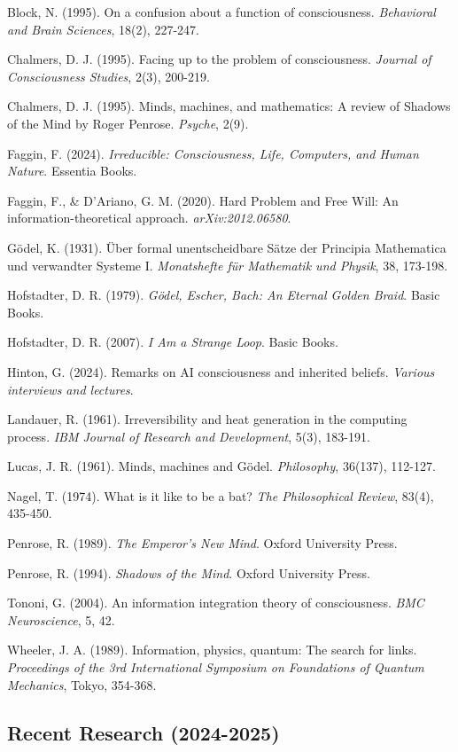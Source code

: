 \documentclass[12pt,a4paper]{article}
\begin{document}
Block, N. (1995). On a confusion about a function of consciousness. \textit{Behavioral and Brain Sciences}, 18(2), 227-247.

Chalmers, D. J. (1995). Facing up to the problem of consciousness. \textit{Journal of Consciousness Studies}, 2(3), 200-219.

Chalmers, D. J. (1995). Minds, machines, and mathematics: A review of Shadows of the Mind by Roger Penrose. \textit{Psyche}, 2(9).

Faggin, F. (2024). \textit{Irreducible: Consciousness, Life, Computers, and Human Nature}. Essentia Books.

Faggin, F., \& D'Ariano, G. M. (2020). Hard Problem and Free Will: An information-theoretical approach. \textit{arXiv:2012.06580}.

G\"{o}del, K. (1931). \"{U}ber formal unentscheidbare S\"{a}tze der Principia Mathematica und verwandter Systeme I. \textit{Monatshefte f\"{u}r Mathematik und Physik}, 38, 173-198.

Hofstadter, D. R. (1979). \textit{G\"{o}del, Escher, Bach: An Eternal Golden Braid}. Basic Books.

Hofstadter, D. R. (2007). \textit{I Am a Strange Loop}. Basic Books.

Hinton, G. (2024). Remarks on AI consciousness and inherited beliefs. \textit{Various interviews and lectures}.

Landauer, R. (1961). Irreversibility and heat generation in the computing process. \textit{IBM Journal of Research and Development}, 5(3), 183-191.

Lucas, J. R. (1961). Minds, machines and G\"{o}del. \textit{Philosophy}, 36(137), 112-127.

Nagel, T. (1974). What is it like to be a bat? \textit{The Philosophical Review}, 83(4), 435-450.

Penrose, R. (1989). \textit{The Emperor's New Mind}. Oxford University Press.

Penrose, R. (1994). \textit{Shadows of the Mind}. Oxford University Press.

Tononi, G. (2004). An information integration theory of consciousness. \textit{BMC Neuroscience}, 5, 42.

Wheeler, J. A. (1989). Information, physics, quantum: The search for links. \textit{Proceedings of the 3rd International Symposium on Foundations of Quantum Mechanics}, Tokyo, 354-368.

\subsection*{Recent Research (2024-2025)}
\end{document}
